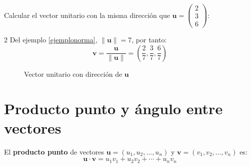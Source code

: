 \begin{example}
Calcular el vector unitario con la misma dirección que $\mathbf{u} = \begin{pmatrix} 2 \\ 3 \\ 6 \end{pmatrix}$:

\begin{myproof}
\begin{multicols}{2}
Del ejemplo \ref{ejemplonorma}, $\|\mathbf{u}\| = 7$, por tanto:
$$\mathbf{v} = \frac{\mathbf{u}}{\|\mathbf{u}\|} = \left(\frac{2}{7}, \frac{3}{7}, \frac{6}{7}\right)$$

\columnbreak
\begin{figure}[H]
\centering
{}
\caption{Vector unitario con dirección de $\mathbf{u}$}
\label{fig:vector_unitario}
\end{figure}
\end{multicols}
\end{myproof}
\end{example}

\section{Producto punto y ángulo entre vectores}

\begin{definition}
El \textbf{producto punto} de vectores $\mathbf{u} = (u_1, u_2, \ldots, u_n)$ y $\mathbf{v} = (v_1, v_2, \ldots, v_n)$ es:
$$\mathbf{u} \cdot \mathbf{v} = u_1v_1 + u_2v_2 + \cdots + u_nv_n$$
\end{definition}

